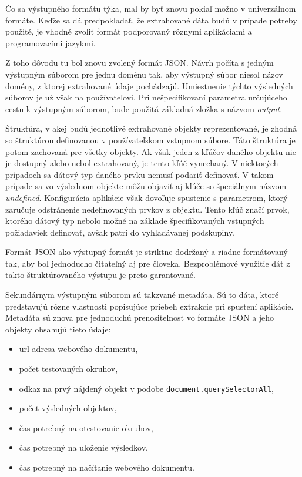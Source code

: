 Čo sa výstupného formátu týka, mal by byť znovu pokiaľ možno v univerzálnom formáte. Keďže sa dá predpokladať, že extrahované dáta budú v prípade potreby použité, je vhodné zvoliť formát podporovaný rôznymi aplikáciami a programovacími jazykmi.

Z toho dôvodu tu bol znovu zvolený formát JSON. Návrh počíta s jedným výstupným súborom pre jednu doménu tak, aby výstupný súbor niesol názov domény, z ktorej extrahované údaje pochádzajú. Umiestnenie týchto výsledných súborov je už však na používateľovi. Pri nešpecifikovaní parametra určujúceho cestu k výstupným súborom, bude použitá základná zložka s názvom \textit{output}.

\bigskip

Štruktúra, v akej budú jednotlivé extrahované objekty reprezentované, je zhodná so štruktúrou definovanou v používateľskom vstupnom súbore. Táto štruktúra je potom zachovaná pre všetky objekty. Ak však jeden z kľúčov daného objektu nie je dostupný alebo nebol extrahovaný, je tento kľúč vynechaný. V niektorých prípadoch sa dátový typ daného prvku nemusí podariť definovať. V takom prípade sa vo výslednom objekte môžu objaviť aj kľúče so špeciálnym názvom \textit{undefined}. Konfigurácia aplikácie však dovoľuje spustenie s parametrom, ktorý zaručuje odstránenie nedefinovaných prvkov z objektu. Tento kľúč značí prvok, ktorého dátový typ nebolo možné na základe špecifikovaných vstupných požiadaviek definovať, avšak patrí do vyhľadávanej podskupiny.

Formát JSON ako výstupný formát je striktne dodržaný a riadne formátovaný tak, aby bol jednoducho čitateľný aj pre človeka. Bezproblémové využitie dát z takto štruktúrovaného výstupu je preto garantované.

\bigskip

Sekundárnym výstupným súborom sú takzvané metadáta. Sú to dáta, ktoré predstavujú rôzne vlastnosti popisujúce priebeh extrakcie pri spustení aplikácie. Metadáta sú znova pre jednoduchú prenositeľnosť vo formáte JSON a jeho objekty obsahujú tieto údaje:

\begin{itemize}
    \item url adresa webového dokumentu,
    \item počet testovaných okruhov,
    \item odkaz na prvý nájdený objekt v podobe \texttt{document.querySelectorAll},
    \item počet výsledných objektov,
    \item čas potrebný na otestovanie okruhov,
    \item čas potrebný na uloženie výsledkov,
    \item čas potrebný na načítanie webového dokumentu.
\end{itemize}


